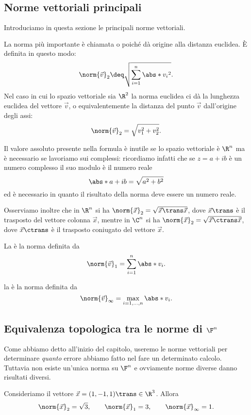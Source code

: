 \subsection{Norme vettoriali principali}

Introduciamo in questa sezione le principali norme vettoriali.

 La norma più importante è chiamata  o  poiché dà origine alla distanza euclidea. È definita in questo modo: \[
    \norm{\vec v}_2 \deq \sqrt{\sum_{i=1}^n \abs*{v_i}^2}.
\] Nel caso in cui lo spazio vettoriale sia $\R^2$ la norma euclidea ci dà la lunghezza euclidea del vettore $\vec v$, o equivalentemente la distanza del punto $\vec v$ dall'origine degli assi: \[
    \norm{\vec v}_2 = \sqrt{v_1^2 + v_2^2}.
\] 

Il valore assoluto presente nella formula è inutile se lo spazio vettoriale è $\R^n$ ma è necessario se lavoriamo sui complessi: ricordiamo infatti che se $z = a+ib$ è un numero complesso il suo modulo è il numero reale \[
    \abs*{a+ib} = \sqrt{a^2 + b^2}
\] ed è necessario in quanto il risultato della norma deve essere un numero reale.

Osserviamo inoltre che in $\R^n$ si ha 
$\norm{\vec x}_2 = \sqrt{\vec x\trans \vec x}$, 
dove $\vec x\trans$ è il trasposto del vettore colonna $\vec x$, 
mentre in $\C^n$ si ha $\norm{\vec x}_2 = \sqrt{\vec x\ctrans \vec x}$, 
dove $\vec x\ctrans$ è il trasposto coniugato del vettore $\vec x$.

 La  è la norma definita da \[
    \norm{\vec v}_1 = \sum_{i=1}^n \abs*{v_i}.
\]

 la  è la norma definita da \[
    \norm{\vec v}_\infty = \max_{i=1, \dots, n} \abs*{v_i}.
\]

\subsection{Equivalenza topologica tra le norme di $\F^n$}

Come abbiamo detto all'inizio del capitolo, useremo le norme vettoriali per determinare \emph{quanto} errore abbiamo fatto nel fare un determinato calcolo. Tuttavia non esiste un'unica norma su $\F^n$ e ovviamente norme diverse danno risultati diversi.

\begin{example}
    Consideriamo il vettore $\vec x = (1, -1, 1)\trans \in \R^3$. Allora \[
        \norm{\vec x}_2 = \sqrt 3, \qquad \norm{\vec x}_1 = 3, \qquad \norm{\vec x}_\infty = 1.
    \]
\end{example}

